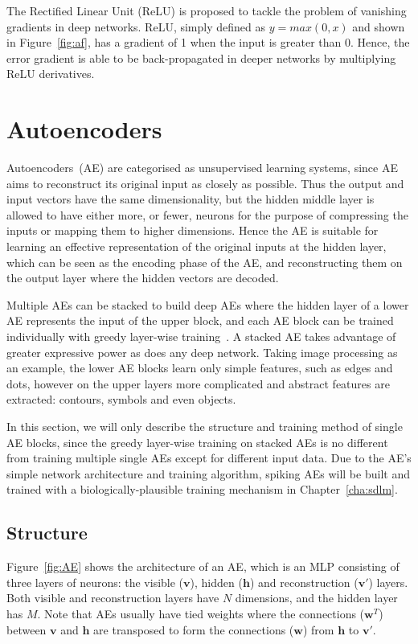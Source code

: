 The Rectified Linear Unit (ReLU) is proposed to tackle the problem of vanishing gradients in deep networks.
ReLU, simply defined as $y = max(0,x)$ and shown in Figure~\ref{fig:af}, has a gradient of 1 when the input is greater than 0.
Hence, the error gradient is able to be back-propagated in deeper networks by multiplying ReLU derivatives.

\section{Autoencoders}
\label{sec:AE}
Autoencoders~(AE) are categorised as unsupervised learning systems, since AE aims to reconstruct its original input as closely as possible.
Thus the output and input vectors have the same dimensionality, but the hidden middle layer is allowed to have either more, or fewer, neurons for the purpose of compressing the inputs or mapping them to higher dimensions.
Hence the AE is suitable for learning an effective representation of the original inputs at the hidden layer, which can be seen as the encoding phase of the AE, and reconstructing them on the output layer where the hidden vectors are decoded. 

Multiple AEs can be stacked to build deep AEs where the hidden layer of a lower AE represents the input of the upper block, and each AE block can be trained individually with greedy layer-wise training~\citep{hinton2006fast}.
A stacked AE takes advantage of greater expressive power as does any deep network.
Taking image processing as an example, the lower AE blocks learn only simple features, such as edges and dots, however on the upper layers more complicated and abstract features are extracted: contours, symbols and even objects. 

In this section, we will only describe the structure and training method of single AE blocks, since the greedy layer-wise training on stacked AEs is no different from training multiple single AEs except for different input data.
Due to the AE's simple network architecture and training algorithm, spiking AEs will be built and trained with a biologically-plausible training mechanism in Chapter~\ref{cha:sdlm}.

\subsection{Structure}
Figure~\ref{fig:AE} shows the architecture of an AE, which is an MLP consisting of three layers of neurons: the visible ($\mathbf{v}$), hidden ($\mathbf{h}$) and reconstruction ($\mathbf{v'}$) layers.
Both visible and reconstruction layers have $N$ dimensions, and the hidden layer has $M$.
Note that AEs usually have tied weights where the connections ($\mathbf{w}^T$) between $\mathbf{v}$ and $\mathbf{h}$ are transposed to form the connections ($\mathbf{w}$) from $\mathbf{h}$ to $\mathbf{v'}$.


